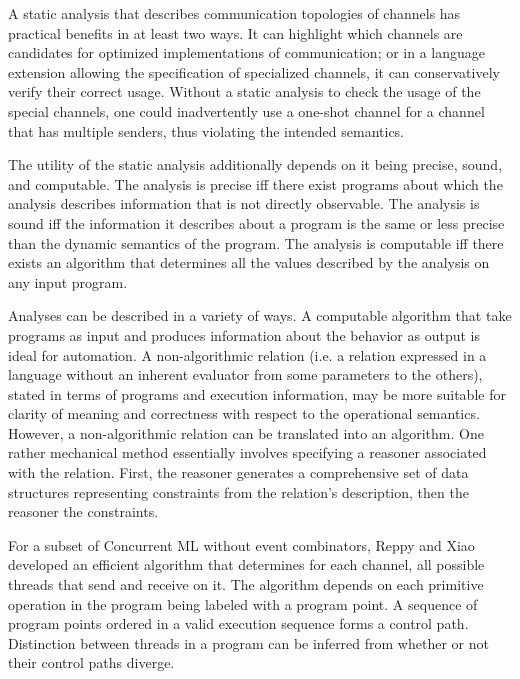 \documentclass[10pt]{article}
\begin{document}
A static analysis that describes communication
topologies of channels has practical benefits in at least two ways.  It can highlight which
channels are candidates for optimized implementations of communication; or in a language
extension allowing the specification of specialized channels, it can conservatively verify
their correct usage. Without a static analysis to check the usage of the special channels, one
could inadvertently use a one-shot channel for a channel that has multiple senders, thus
violating the intended semantics. 

The utility of the static analysis additionally depends on it being precise, sound, and
computable. The analysis is precise iff there exist programs about which the analysis
describes information that is not directly observable. The analysis is sound iff the
information it describes about a program is the same or less precise than the dynamic
semantics of the program. The analysis is computable iff there exists an algorithm that
determines all the values described by the analysis on any input program.

Analyses can be described in a variety of ways. A computable algorithm that take programs
as input and produces information about the behavior as output is ideal for automation. A
non-algorithmic relation (i.e. a relation expressed in a language without an inherent evaluator
from some parameters to the others),
stated in terms of programs and execution information, may be
more suitable for clarity of meaning and correctness with respect to the operational
semantics. However, a non-algorithmic relation can be translated into an algorithm.
One rather mechanical method essentially involves
specifying a reasoner associated with the relation. 
First, the reasoner generates a comprehensive set of data structures representing
constraints from the relation's description, then the reasoner the constraints.

For a subset of Concurrent ML without event combinators, Reppy and Xiao developed an
efficient algorithm that determines for each channel, all possible threads that send
and receive on it. The algorithm depends on each primitive operation in the program being
labeled with a program point. A sequence of program points ordered in a valid execution
sequence forms a control path. Distinction between threads in a program can be inferred from
whether or not their control paths diverge.  
\end{document}
